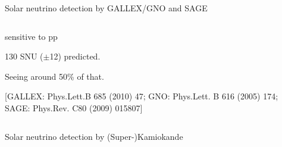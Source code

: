 \begin{frame}[t]{Solar neutrino detection by GALLEX/GNO and SAGE}
\begin{columns}
\begin{column}{0.45\textwidth}
\begin{itemize}
{\begin{itemize}
        {\small
            \item  sensitive to pp
        }
        \end{itemize}
      \item 130 SNU ($\pm$12) predicted.
      \item Seeing around 50\% of that.\\
    }
    \end{itemize}
      {\scriptsize
         \color{blue}
           [GALLEX: Phys.Lett.B 685 (2010) 47; GNO: Phys.Lett. B 616
           (2005) 174; SAGE: Phys.Rev. C80 (2009) 015807]
      }
  \end{column}
\end{columns}
\end{frame}


\begin{frame}[t]{Solar neutrino detection by (Super-)Kamiokande}


\end{frame}
